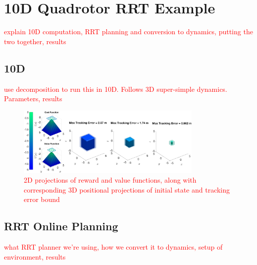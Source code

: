 \section{10D Quadrotor RRT Example \label{sec:results}}
\textcolor{red}{explain 10D computation, RRT planning and conversion to dynamics, putting the two together, results}
\subsection{10D}
\textcolor{red}{use decomposition to run this in 10D. Follows 3D super-simple dynamics. Parameters, results}
\begin{figure}
	\centering
	\includegraphics[width=0.8\textwidth]{fig/quad10D_example2}
	\caption{\textcolor{red}{2D projections of reward and value functions, along with corresponding 3D positional projections of initial state and tracking error bound}}
	\label{fig:quad10D_example}
\end{figure} 
\subsection{RRT Online Planning}
\textcolor{red}{what RRT planner we're using, how we convert it to dynamics, setup of environment, results}